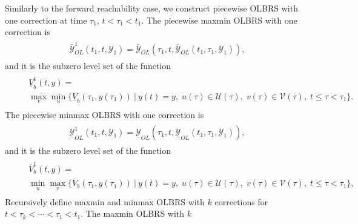 \documentclass[letterpaper,10pt,english]{sphinxmanual}
\begin{document}
Similarly to the forward reachability case, we construct piecewise OLBRS
with one correction at time $\tau_1$, $t<\tau_1<t_1$. The
piecewise maxmin OLBRS with one correction is
\label{main_source:equation-maxminb1}\begin{gather}
\begin{split}\overline{{\mathcal Y}}_{OL}^1(t_1, t, {\mathcal Y}_1) = \overline{{\mathcal Y}}_{OL}(\tau_1, t, \overline{{\mathcal Y}}_{OL}(t_1, \tau_1, {\mathcal Y}_1)),\end{split}\label{main_source-maxminb1}
\end{gather}
and it is the subzero level set of the function
\label{main_source:equation-maxminvfb1}\begin{gather}
\begin{split}\begin{aligned}
&&\underline{V}^1_b(t, y) = \nonumber \\
&&\max_v\min_u\{\underline{V}_b(\tau_1, y(\tau_1)) ~|~
y(t)=y, \; u(\tau)\in{\mathcal U}(\tau), \;
v(\tau)\in{\mathcal V}(\tau), \; t\leqslant\tau<\tau_1\}.
\end{aligned}\end{split}\label{main_source-maxminvfb1}
\end{gather}
The piecewise minmax OLBRS with one correction is
\label{main_source:equation-minmaxb1}\begin{gather}
\begin{split}\underline{{\mathcal Y}}_{OL}^1(t_1, t, {\mathcal Y}_1) = \underline{{\mathcal Y}}_{OL}(\tau_1, t, \underline{{\mathcal Y}}_{OL}(t_1, \tau_1, {\mathcal Y}_1)),\end{split}\label{main_source-minmaxb1}
\end{gather}
and it is the subzero level set of the function
\label{main_source:equation-minmaxvfb1}\begin{gather}
\begin{split}\begin{aligned}
&&\overline{V}^1_b(t, y) = \nonumber \\
&&\min_u\max_v\{\overline{V}_b(\tau_1, y(\tau_1)) ~|~
y(t)=y, \; u(\tau)\in{\mathcal U}(\tau), \;
v(\tau)\in{\mathcal V}(\tau), \; t\leqslant\tau<\tau_1\},
\end{aligned}\end{split}\label{main_source-minmaxvfb1}
\end{gather}
Recursively define maxmin and minmax OLBRS with $k$ corrections
for $t<\tau_k<\cdots<\tau_1<t_1$. The maxmin OLBRS with $k$
\end{document}
